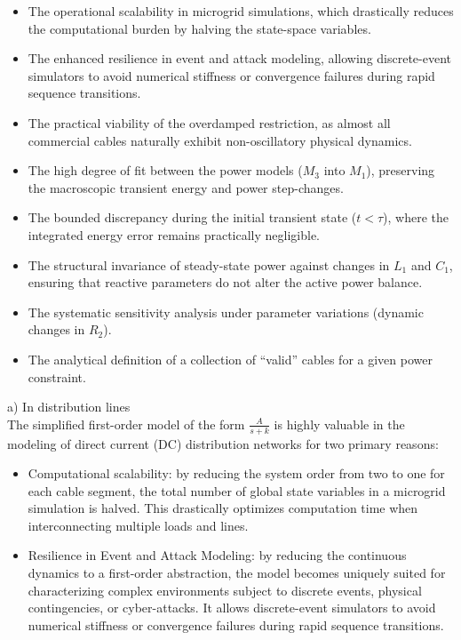 \documentclass[11pt, a4paper]{article}
\begin{document}
\begin{itemize}
    \item {The operational scalability in microgrid simulations,} which drastically reduces the computational burden by halving the state-space variables.
    \item {The enhanced resilience in event and attack modeling,} allowing discrete-event simulators to avoid numerical stiffness or convergence failures during rapid sequence transitions.
    \item {The practical viability of the overdamped restriction,} as almost all commercial cables naturally exhibit non-oscillatory physical dynamics.
    \item {The high degree of fit between the power models ($M_3$ into $M_1$),} preserving the macroscopic transient energy and power step-changes.
    \item {The bounded discrepancy during the initial transient state ($t < \tau$),} where the integrated energy error remains practically negligible.
    \item {The structural invariance of steady-state power against changes in $L_1$ and $C_1$,} ensuring that reactive parameters do not alter the active power balance.
    \item {The systematic sensitivity analysis under parameter variations (dynamic changes in $R_2$).}
    \item {The analytical definition of a collection of ``valid'' cables for a given power constraint.}
\end{itemize}



\medskip\noindent
a) In distribution lines \\
The simplified first-order model of the form $\frac{A}{s+k}$ is highly valuable in the modeling of direct current (DC) distribution networks for two primary reasons:
\begin{itemize}
\item Computational scalability: by reducing the system order from two to one for each cable segment, the total number of global state variables in a microgrid simulation is halved. This drastically optimizes computation time when interconnecting multiple loads and lines.

\item Resilience in Event and Attack Modeling: by reducing the continuous dynamics to a first-order abstraction, the model becomes uniquely suited for characterizing complex environments subject to discrete events, physical contingencies, or cyber-attacks. It allows discrete-event simulators to avoid numerical stiffness or convergence failures during rapid sequence transitions.


\end{itemize}
\end{document}
